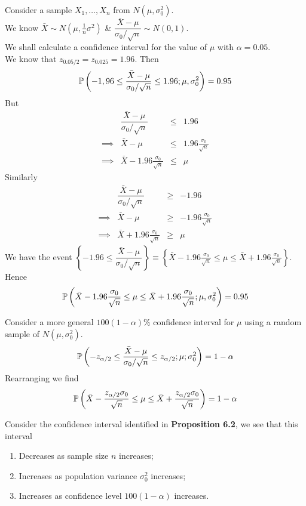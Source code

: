 \documentclass[11pt,a4paper]{article}
\begin{document}
Consider a sample $X_1,\dots,X_n$ from $N(\mu,\sigma_0^2)$.\\
We know $\bar{X}\sim N(\mu,\frac{1}{n}\sigma^2)$ \& $\dfrac{\bar{X}-\mu}{\sigma_0/\sqrt{n}}\sim N(0,1)$.\\
We shall calculate a confidence interval for the value of $\mu$ with $\alpha=0.05$.\\
We know that $z_{0.05/2}=z_{0.025}=1.96$. Then
$$\mathbb{P}\left(-1,96\leq\frac{\bar{X}-\mu}{\sigma_0/\sqrt{n}}\leq1.96;\mu,\sigma_0^2\right)=0.95$$
But
\[\begin{array}{rrcl}
&\dfrac{\bar{X}-\mu}{\sigma_0/\sqrt{n}}&\leq&1.96\\
\implies&\bar{X}-\mu&\leq&1.96\frac{\sigma_0}{\sqrt{n}}\\
\implies&\bar{X}-1.96\frac{\sigma_0}{\sqrt{n}}&\leq&\mu
\end{array}\]
Similarly
\[\begin{array}{rrcl}
&\dfrac{\bar{X}-\mu}{\sigma_0/\sqrt{n}}&\geq&-1.96\\
\implies&\bar{X}-\mu&\geq&-1.96\frac{\sigma_0}{\sqrt{n}}\\
\implies&\bar{X}+1.96\frac{\sigma_0}{\sqrt{n}}&\geq&\mu
\end{array}\]
We have the event $\left\{-1.96\leq\dfrac{\bar{X}-\mu}{\sigma_0/\sqrt{n}}\right\}\equiv\left\{\bar{X}-1.96\frac{\sigma_0}{\sqrt{n}}\leq\mu\leq\bar{X}+1.96\frac{\sigma_0}{\sqrt{n}}\right\}$.\\
Hence
$$\mathbb{P}\left(\bar{X}-1.96\frac{\sigma_0}{\sqrt{n}}\leq\mu\leq\bar{X}+1.96\frac{\sigma_0}{\sqrt{n}};\mu,\sigma_0^2\right)=0.95$$

Consider a more general $100(1-\alpha)\%$ confidence interval for $\mu$ using a random sample of $N(\mu,\sigma_0^2)$.
$$\mathbb{P}\left(-z_{\alpha/2}\leq\frac{\bar{X}-\mu}{\sigma_0/\sqrt{n}}\leq z_{\alpha/2};\mu;\sigma^2_0\right)=1-\alpha$$
Rearranging we find
$$\mathbb{P}\left(\bar{X}-\frac{z_{\alpha/2}\sigma_0}{\sqrt{n}}\leq\mu\leq\bar{X}+\frac{z_{\alpha/2}\sigma_0}{\sqrt{n}}\right)=1-\alpha$$

Consider the confidence interval identified in \textbf{Proposition 6.2}, we see that this interval
\begin{enumerate}[label=\roman*)]
	\item Decreases as sample size $n$ increases;
	\item Increases as population variance $\sigma^2_0$ increases;
	\item Increases as confidence level $100(1-\alpha)$ increases.
\end{enumerate}
\end{document}

